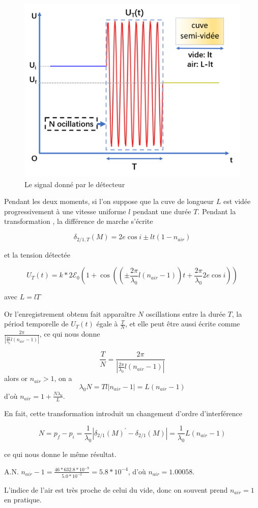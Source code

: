 \documentclass[a4paper,12pt]{book}
\begin{document}
\begin{figure}[h]
    \centering    
    \includegraphics[scale=0.7]{Tr81.png}
    \caption{Le signal donné par le détecteur}   
\end{figure}

Pendant les deux moments, si l'on suppose que la cuve de longueur $L$ est vidée progressivement à une vitesse uniforme $l$ pendant une durée $T$. 
Pendant la transformation , la différence de marche s'écrite 

$$\delta_{2/1,T}(M)=2e\cos{i} \pm lt(1-n_{air})$$

et la tension détectée

$$U_T(t)=k*2\mathcal{E}_0\left(1+\cos\left( \left(\pm \frac{2\pi}{\lambda_0}l(n_{air}-1)\right)t+\frac{2\pi}{\lambda_0}2e\cos{i}\right)\right)$$

avec $L=lT$

Or l'enregistrement obtenu fait apparaître $N$ oscillations entre la durée $T$, la périod temporelle de $U_T(t)$ 
égale à $\frac{T}{N}$, et elle peut être aussi écrite comme $\frac{2\pi}{|\frac{2\pi}{\lambda_0}l(n_{air}-1)|}$, ce qui nous donne

$$
\frac{T}{N}=\frac{2\pi}{|\frac{2\pi}{\lambda_0}l(n_{air}-1)|}
$$
alors or $n_{air}>1$, on a 
$$
\lambda_0 N=Tl|n_{air}-1|=L(n_{air}-1)
$$
d'où $\boxed{n_{air}=1+\frac{N\lambda_0}{L}}$.

En fait, cette transformation introduit un changement d'ordre d'interférence

$$N=p_f-p_i=\frac{1}{\lambda_0}|\delta_{2/1}(M)^{'}-\delta_{2/1}(M)|=\frac{1}{\lambda_0}L(n_{air}-1)$$

ce qui nous donne le même résultat.

A.N. $n_{air}-1=\frac{46*632.8*10^{-9}}{5.0*10^{-2}}=5.8*10^{-4}$, d'où 
$\boxed{n_{air}=1.00058}$. 

L'indice de l'air est très proche de celui du vide, donc on souvent prend $n_{air}=1$ en pratique.
\end{document}
